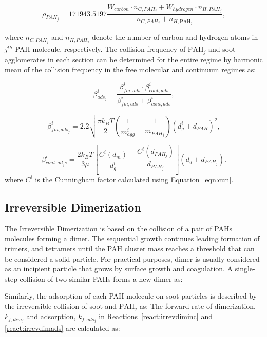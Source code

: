 \begin{equation}
	\rho_{PAH_j}= 
	171943.5197
	\frac{W_{carbon}\cdot n_{C,{PAH}_j}+W_{hydrogen}\cdot n_{H,{PAH}_j}}
	{n_{C,{PAH}_j}+n_{H,\mathrm{PAH}_j}},
	\label{eqn:rhoPAH}
\end{equation}

\noindent where ${n_{C,{PAH}_j}}$ and ${n_{H,{PAH}_j}}$ denote the number of carbon and hydrogen atoms in $j^{th}$ PAH molecule, respectively. The collision frequency of $\mathrm{PAH}_j$ and soot agglomerates in each section can be determined for the entire regime by harmonic mean of the collision frequency in the free molecular and continuum regimes as:

\begin{equation}
	\beta^i_{ads_j}=
	\frac{\beta^i_{fm, ads}\cdot \beta^i_{cont, ads}}
	{\beta^i_{fm, ads}+\beta^i_{cont, ads}},
	\label{eqn:betahmads}
\end{equation}

\begin{equation}
	\beta^i_{fm, ads_j}=
	2.2 
	\sqrt{
		\frac{\pi k_B T}{2}\left(\frac{1}{m^i_{agg}}+\frac{1}{m_{PAH_j}}\right)
	}
	\left(d^i_g+d_{PAH}\right)^2,
	\label{eqn:betafmads}
\end{equation}

\begin{equation}
	\beta^i_{cont, ad_js}=
		\frac{2 k_B T}{3 \mu}
		\left[
			\frac{C^i\left(d_m\right)}{d^i_g}+
			\frac{C^i\left(d_{PAH_j}\right)}{d_{PAH_j}}
		\right]
		\left(d_g+d_{PAH_j}\right).
	\label{eqn:betacontads}
\end{equation}
where $C^i$ is the Cunningham factor calculated using Equation~\eqref{eqn:cun}.
\subsection{Irreversible Dimerization}

The Irreversible Dimerization is based on the collision of a pair of PAHs molecules forming a dimer. The sequential growth continues leading formation of trimers, and tetramers until the PAH cluster mass reaches a threshold that can be considered a solid particle. For practical purposes, dimer is usually considered as an incipient particle that grows by surface growth and coagulation. A single-step collision of two similar PAHs forms a new dimer as:

Similarly, the adsorption of each PAH molecule on soot particles is described by the irreversible collision of soot and $\mathrm{PAH}_j$ as:
The forward rate of dimerization, ${k_{f,dim_j}}$ and adsorption, $k_{f,ads_j}$ in Reactions~\eqref{react:irrevdiminc} and \eqref{react:irrevdimads} are calculated as:

